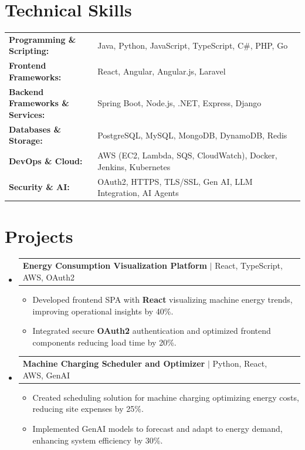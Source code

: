 \documentclass[letterpaper,10pt]{article}
\makeatletter
\newcommand{\resumeItem}[1]{
  \item{\fontsize{8pt}{9pt}\selectfont
    #1 \vspace{-3pt}
  }
}
\newcommand{\resumeProjectHeading}[2]{
    \item
    \begin{tabular*}{1.001\textwidth}{l@{\extracolsep{\fill}}r}
      \fontsize{8.5pt}{10pt}#1 & \textbf{\fontsize{8.5pt}{10pt} #2}\\
    \end{tabular*}\vspace{-7pt}
}
\newcommand{\resumeSubHeadingListStart}{\begin{itemize}[leftmargin=0pt, label={}]}
\newcommand{\resumeSubHeadingListEnd}{\end{itemize}}
\newcommand{\resumeItemListStart}{\begin{itemize}[leftmargin=*]}
\newcommand{\resumeItemListEnd}{\end{itemize}\vspace{-5pt}}
\makeatother
\begin{document}
\section{Technical Skills}
        \vspace{-14pt}
        \begin{table}[h]
            \fontsize{8pt}{9pt}\selectfont
            \begin{tabular}{p{0.3\linewidth} p{0.7\linewidth}}
                \textbf{Programming \& Scripting:} & Java, Python, JavaScript, TypeScript, C\#, PHP, Go \\
                \textbf{Frontend Frameworks:} & React, Angular, Angular.js, Laravel \\
                \textbf{Backend Frameworks \& Services:} & Spring Boot, Node.js, .NET, Express, Django \\
                \textbf{Databases \& Storage:} & PostgreSQL, MySQL, MongoDB, DynamoDB, Redis \\
                \textbf{DevOps \& Cloud:} & AWS (EC2, Lambda, SQS, CloudWatch), Docker, Jenkins, Kubernetes \\
                \textbf{Security \& AI:} & OAuth2, HTTPS, TLS/SSL, Gen AI, LLM Integration, AI Agents \\
            \end{tabular}
        \end{table}
 \vspace{-18pt}

\section{Projects}
    \vspace{-5pt}
    \resumeSubHeadingListStart
          \resumeProjectHeading
            {\textbf{Energy Consumption Visualization Platform} $|$ React, TypeScript, AWS, OAuth2}{}
            \resumeItemListStart
                \resumeItem{Developed frontend SPA with \textbf{React} visualizing machine energy trends, improving operational insights by 40\%.}
                \resumeItem{Integrated secure \textbf{OAuth2} authentication and optimized frontend components reducing load time by 20\%.}
            \resumeItemListEnd
        \vspace{-12pt}
    
        \resumeProjectHeading
            {\textbf{Machine Charging Scheduler and Optimizer} $|$ Python, React, AWS, GenAI}{}
        \resumeItemListStart
                \resumeItem{Created scheduling solution for machine charging optimizing energy costs, reducing site expenses by 25\%.}
                \resumeItem{Implemented GenAI models to forecast and adapt to energy demand, enhancing system efficiency by 30\%.}
        \resumeItemListEnd
      \vspace{-12pt}
    \resumeSubHeadingListEnd
\end{document}
